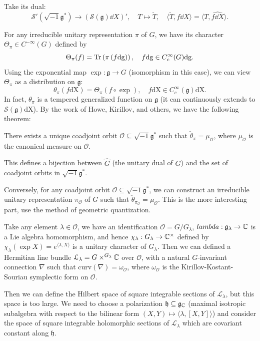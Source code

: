\documentclass[12pt]{amsart}
\numberwithin{equation}{section}
\newcommand{\fg}{\mathfrak{g}} \newcommand{\fh}{\mathfrak{h}} \newcommand{\fk}{\mathfrak{k}}
\newcommand{\bra}[1]{\left(#1\right)}
\renewcommand{\hat}{\widehat}
\begin{document}
Take its dual:
\[
    \mathcal{S}'(\sqrt{-1}\fg^*) \to (\mathcal{S}(\fg)\dd X)', \quad T \mapsto \check{T}, \quad \langle \check{T}, f\dd X \rangle = \langle T, \hat{f\dd X} \rangle.
\]

For any irreducible unitary representation $\pi$ of $G$, we have its character $\Theta_\pi \in C^{-\infty}(G)$ defined by
\[\Theta_\pi(f) = \Tr\bra{\pi\bra{f\mathrm{dg}}}, \quad f\mathrm{dg} \in C_c^\infty(G)\mathrm{dg}.\]
Using the exponential map $\exp : \fg \to G$ (isomorphism in this case), we can view $\Theta_\pi$ as a distribution on $\fg$:
\[\theta_\pi(f\mathrm{dX}) = \Theta_\pi(f \circ \exp), \quad f\mathrm{dX} \in C_{c}^{\infty}(\fg)\mathrm{dX}.\]
In fact, $\theta_{\pi}$ is a tempered generalized function on $\fg$ (it can continuously extends to $\mathcal{S}(\fg)\mathrm{dX}$).
By the work of Howe, Kirillov, and others, we have the following theorem:
\begin{thm}
    There exists a unique coadjoint orbit $\mathcal{O} \subseteq \sqrt{-1}\fg^*$ such that $\check{\theta}_\pi = \mu_{\mathcal{O}}$, where $\mu_{\mathcal{O}}$ is the canonical measure on $\mathcal{O}$.
\end{thm}

This defines a bijection between $\hat{G}$ (the unitary dual of $G$) and the set of coadjoint orbits in $\sqrt{-1}\fg^*$.

Conversely, for any coadjoint orbit $\mathcal{O} \subseteq \sqrt{-1}\fg^*$, we can construct an irreducible unitary representation $\pi_{\mathcal{O}}$ of $G$ such that $\check{\theta}_{\pi_{\mathcal{O}}} = \mu_{\mathcal{O}}$. This is the more interesting part, use the method of geometric quantization.

Take any element $\lambda \in \mathcal{O}$, we have an identification $\mathcal{O} = G/G_{\lambda}$, $lambda: \fg_{\lambda} \to \BC$ is a Lie algebra homomorphism, and hence $\chi_{\lambda} : G_{\lambda} \to {\mathbb {C}}^\times$ defined by $\chi_{\lambda}(\exp X) = e^{\langle \lambda,X \rangle}$ is a unitary character of $G_{\lambda}$. Then we can defined a Hermitian line bundle $\mathcal{L}_{\lambda} = G \times^{G_{\lambda}} {\mathbb {C}}$ over $\mathcal{O}$, with a natural $G$-invariant connection $\nabla$ such that $\mathrm{curv}(\nabla) = \omega_{\mathcal{O}}$, where $\omega_{\mathcal{O}}$ is the Kirillov-Kostant-Souriau symplectic form on $\mathcal{O}$.

Then we can define the Hilbert space of square integrable sections of $\mathcal{L}_{\lambda}$, but this space is too large. We need to choose a polarization $\mathfrak{h} \subseteq \fg_{\BC}$ (maximal isotropic subalgebra with respect to the bilinear form $(X,Y) \mapsto \langle \lambda, [X,Y] \rangle$) and consider the space of square integrable holomorphic sections of $\mathcal{L}_{\lambda}$ which are covariant constant along $\mathfrak{h}$.
\end{document}
